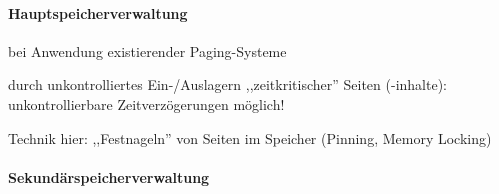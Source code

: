 \documentclass[a4paper]{article}
\begin{document}
\begin{multicols}{3}
    \paragraph{Hauptspeicherverwaltung}

    \begin{itemize*}
        \item
        bei Anwendung existierender Paging-Systeme
        \begin{itemize*}
            \item durch unkontrolliertes Ein-/Auslagern ,,zeitkritischer'' Seiten (-inhalte): unkontrollierbare Zeitverzögerungen möglich!
            \item Technik hier: ,,Festnageln'' von Seiten im Speicher (Pinning, Memory Locking)
        \end{itemize*}
    \end{itemize*}


    \paragraph{Sekundärspeicherverwaltung}


\end{multicols}
\end{document}
